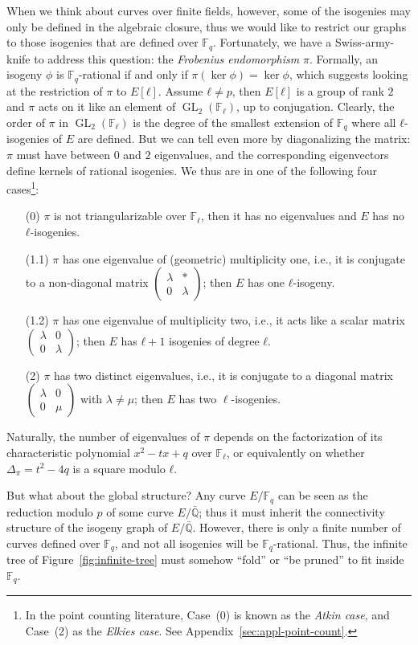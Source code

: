 \documentclass[10pt]{article}
\theoremstyle{plain}
\theoremstyle{definition}
\DeclareMathOperator{\GL}{GL}
\def\F{\ensuremath{\mathbb{F}}}
\def\mat#1{\left(\begin{smallmatrix}#1\end{smallmatrix}\right)}
\begin{document}
When we think about curves over finite fields, however, some of the
isogenies may only be defined in the algebraic closure, thus we would
like to restrict our graphs to those isogenies that are defined over
$\F_q$. %
Fortunately, we have a Swiss-army-knife to address this question: the
\emph{Frobenius endomorphism} $π$. %
Formally, an isogeny $ϕ$ is $\F_q$-rational if and only if
$π(\ker ϕ)=\ker ϕ$, which suggests looking at the restriction of $π$
to $E[ℓ]$. %
Assume $ℓ≠p$, then $E[ℓ]$ is a group of rank $2$ and $π$ acts on it
like an element of $\GL_2(\F_ℓ)$, up to conjugation. %
Clearly, the order of $π$ in $\GL_2(\F_ℓ)$ is the degree of the
smallest extension of $\F_q$ where all $ℓ$-isogenies of $E$ are
defined. %
But we can tell even more by diagonalizing the matrix: $π$ must have
between $0$ and $2$ eigenvalues, and the corresponding eigenvectors
define kernels of rational isogenies. %
We thus are in one of the following four cases\footnote{In the point
  counting literature, Case~(0) is known as the \emph{Atkin case}, and
  Case~(2) as the \emph{Elkies case}. See
  Appendix~\ref{sec:appl-point-count}.}:
\begin{itemize}
\item[(0)] $π$ is not triangularizable over $\F_ℓ$, then it has no
  eigenvalues and $E$ has no $ℓ$-isogenies.
\item[(1.1)] $π$ has one eigenvalue of (geometric) multiplicity one,
  i.e., it is conjugate to a non-diagonal matrix
  $\mat{λ&*\\0&λ}$; then
  $E$ has one $ℓ$-isogeny.
\item[(1.2)] $π$ has one eigenvalue of multiplicity two, i.e., it acts
  like a scalar matrix
  $\mat{λ&0\\0&λ}$; then
  $E$ has $ℓ+1$ isogenies of degree $ℓ$.
\item[(2)] $π$ has two distinct eigenvalues, i.e., it is conjugate to
  a diagonal matrix
  $\mat{λ&0\\0&μ}$ with
  $\lambda\neq\mu$; then $E$ has two $\ell$-isogenies.
\end{itemize}

Naturally, the number of eigenvalues of $π$ depends on the
factorization of its characteristic polynomial $x^2-tx+q$ over $\F_ℓ$,
or equivalently on whether $Δ_π=t^2-4q$ is a square modulo $ℓ$. %

But what about the global structure? %
Any curve $E/\F_q$ can be seen as the reduction modulo $p$ of some
curve $E/\bar{ℚ}$; thus it must inherit the connectivity structure of
the isogeny graph of $E/\bar{ℚ}$. %
However, there is only a finite number of curves defined over $\F_q$,
and not all isogenies will be $\F_q$-rational. %
Thus, the infinite tree of Figure~\ref{fig:infinite-tree} must somehow
``fold'' or ``be pruned'' to fit inside $\F_q$. %
\end{document}
